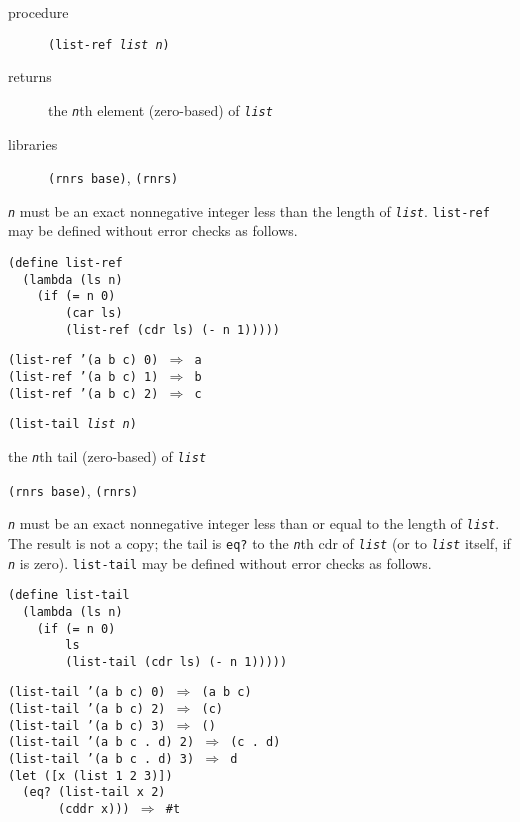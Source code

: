 \begin{description}

\label{objects_s47}\item[procedure] \texttt{(list-ref \textit{list} \textit{n})}



\item[returns] the \texttt{\textit{n}}th element (zero-based) of \texttt{\textit{list}}


\item[libraries] \texttt{(rnrs base)}, \texttt{(rnrs)}
\end{description}

\texttt{\textit{n}} must be an exact nonnegative integer less than
the length of \texttt{\textit{list}}.
\texttt{list-ref} may be defined without error checks as follows.

\begin{alltt}
(define list-ref\label{objects_defn_list_ref}
  (lambda (ls n)
    (if (= n 0)
        (car ls)
        (list-ref (cdr ls) (- n 1)))))

(list-ref '(a b c) 0) \(\Rightarrow\) a
(list-ref '(a b c) 1) \(\Rightarrow\) b
(list-ref '(a b c) 2) \(\Rightarrow\) c
\end{alltt}

\begin{description}

\label{objects_s48}\item[procedure] \texttt{(list-tail \textit{list} \textit{n})}



\item[returns] the \texttt{\textit{n}}th tail (zero-based) of \texttt{\textit{list}}


\item[libraries] \texttt{(rnrs base)}, \texttt{(rnrs)}
\end{description}

\texttt{\textit{n}} must be an exact nonnegative integer less than or equal to
the length of \texttt{\textit{list}}.
The result is not a copy; the tail is \texttt{eq?} to the \texttt{\textit{n}}th cdr of
\texttt{\textit{list}} (or to \texttt{\textit{list}} itself, if \texttt{\textit{n}} is zero).
\texttt{list-tail} may be defined without error checks as follows.

\begin{alltt}
(define list-tail\label{objects_defn_list_tail}
  (lambda (ls n)
    (if (= n 0)
        ls
        (list-tail (cdr ls) (- n 1)))))

(list-tail '(a b c) 0) \(\Rightarrow\) (a b c)
(list-tail '(a b c) 2) \(\Rightarrow\) (c)
(list-tail '(a b c) 3) \(\Rightarrow\) ()
(list-tail '(a b c . d) 2) \(\Rightarrow\) (c . d)
(list-tail '(a b c . d) 3) \(\Rightarrow\) d
(let ([x (list 1 2 3)])
  (eq? (list-tail x 2)
       (cddr x))) \(\Rightarrow\) \#{}t
\end{alltt}

